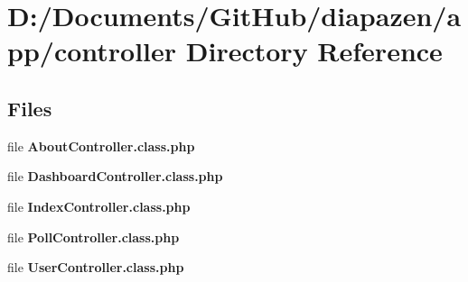 \section{D\-:/\-Documents/\-Git\-Hub/diapazen/app/controller Directory Reference}
\label{dir_d48e90df66012c0915f496a490a70648}
\subsection*{Files}
\begin{DoxyCompactItemize}
\item 
file {\bfseries About\-Controller.\-class.\-php}
\item 
file {\bfseries Dashboard\-Controller.\-class.\-php}
\item 
file {\bfseries Index\-Controller.\-class.\-php}
\item 
file {\bfseries Poll\-Controller.\-class.\-php}
\item 
file {\bfseries User\-Controller.\-class.\-php}
\end{DoxyCompactItemize}
